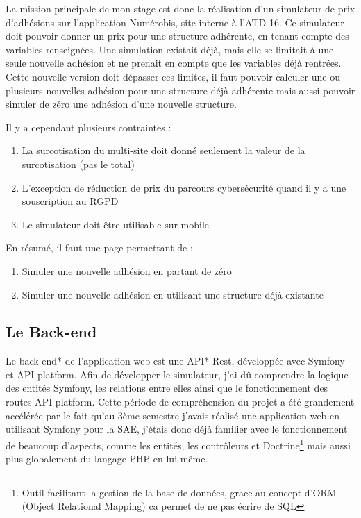 \documentclass[a4paper,12pt]{report}
\begin{document}
La mission principale de mon stage est donc la réalisation d'un simulateur de prix d'adhésions sur l'application Numérobis, site interne à l'ATD 16. Ce simulateur doit pouvoir donner un prix pour une structure adhérente, en tenant compte des variables renseignées. Une simulation existait déjà, mais elle se limitait à une seule nouvelle adhésion et ne prenait en compte que les variables déjà rentrées. Cette nouvelle version doit dépasser ces limites, il faut pouvoir calculer une ou plusieurs nouvelles adhésion pour une structure déjà adhérente mais aussi pouvoir simuler de zéro une adhésion d'une nouvelle structure. 

Il y a cependant plusieurs contraintes :
\begin{enumerate}
    \item La surcotisation du multi-site doit donné seulement la valeur de la surcotisation (pas le total)
    \item L'exception de réduction de prix du parcours cybersécurité quand il y a une souscription au RGPD
    \item Le simulateur doit être utilisable sur mobile
\end{enumerate}

En résumé, il faut une page permettant de :
\begin{enumerate}
    \item Simuler une nouvelle adhésion en partant de zéro
    \item Simuler une nouvelle adhésion en utilisant une structure déjà existante
\end{enumerate}

\subsection{Le Back-end}
Le back-end* de l'application web est une API* Rest, développée avec Symfony et API platform. Afin de développer le simulateur, j'ai dû comprendre la logique des entités Symfony, les relations entre elles ainsi que le fonctionnement des routes API platform. Cette période de compréhension du projet a été grandement accélérée par le fait qu'au 3ème semestre j'avais réalisé une application web en utilisant Symfony pour la SAE, j'étais donc déjà familier avec le fonctionnement de beaucoup d'aspects, comme les entités, les contrôleurs et Doctrine\footnote{Outil facilitant la gestion de la base de données, grace au concept d'ORM (Object Relational Mapping) ca permet de ne pas écrire de SQL} mais aussi plus globalement du langage PHP en lui-même.
\end{document}
